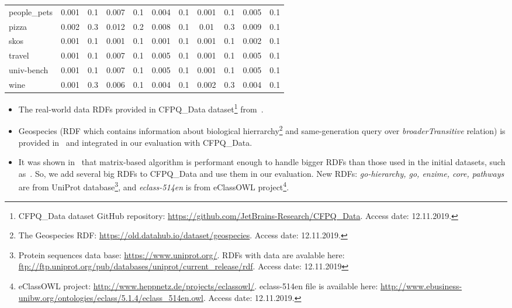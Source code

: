 {\begin{table*}[h]
\begin{tabular}{| l | c  c | c  c | c  c | c  c | c  c |}
people\_pets                & 0.001 & 0.1  & 0.007 & 0.1 & 0.004 & 0.1   & 0.001 & 0.1  & 0.005 & 0.1   \\
pizza                       & 0.002 & 0.3  & 0.012 & 0.2 & 0.008 & 0.1   & 0.01  & 0.3  & 0.009 & 0.1   \\
skos                        & 0.001 & 0.1  & 0.001 & 0.1 & 0.001 & 0.1   & 0.001 & 0.1  & 0.002 & 0.1   \\
travel                      & 0.001 & 0.1  & 0.007 & 0.1 & 0.005 & 0.1   & 0.001 & 0.1  & 0.005 & 0.1   \\
univ-bench                  & 0.001 & 0.1  & 0.007 & 0.1 & 0.005 & 0.1   & 0.001 & 0.1  & 0.005 & 0.1   \\
wine                        & 0.001 & 0.3  & 0.006 & 0.1 & 0.004 & 0.1   & 0.002 & 0.3  & 0.004 & 0.1  \\
    \hline
  \end{tabular}
\end{table*}
}

\begin{itemize}
\item The real-world data RDFs provided in CFPQ\_Data dataset\footnote{CFPQ\_Data dataset GitHub repository: \url{https://github.com/JetBrains-Research/CFPQ_Data}. Access date: 12.11.2019.} from~\cite{Mishin:2019:ECP:3327964.3328503}.
\item Geospecies (RDF which contains information about biological hierrarchy\footnote{The Geospecies RDF: \url{https://old.datahub.io/dataset/geospecies}. Access date: 12.11.2019.} and same-generation query over \textit{broaderTransitive} relation) is provided in~\cite{Kuijpers:2019:ESC:3335783.3335791} and integrated in our evaluation with CFPQ\_Data.
\item It was shown in~\cite{Mishin:2019:ECP:3327964.3328503} that matrix-based algorithm is performant enough to handle bigger RDFs than those used in the initial datasets, such as~\cite{RDF}.
So, we add several big RDFs to CFPQ\_Data and use them in our evaluation.
New RDFs: \textit{go-hierarchy, go, enzime, core, pathways} are from UniProt database\footnote{Protein sequences data base: \url{https://www.uniprot.org/}. RDFs with data are avalable here: \url{ftp://ftp.uniprot.org/pub/databases/uniprot/current_release/rdf}. Access date: 12.11.2019}, and \textit{eclass-514en} is from eClassOWL project\footnote{eClassOWL project: \url{http://www.heppnetz.de/projects/eclassowl/}. eclass-514en file is available here: \url{http://www.ebusiness-unibw.org/ontologies/eclass/5.1.4/eclass_514en.owl}. Access date: 12.11.2019.}.
\end{itemize}

